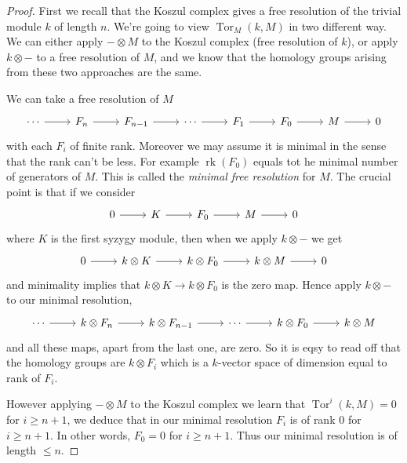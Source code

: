 \documentclass[a4paper]{article}
\DeclareMathOperator{\Tor}{Tor}
\begin{document}
\begin{proof}
  First we recall that the Koszul complex gives a free resolution of the trivial module \(k\) of length \(n\). We're going to view \(\Tor_M(k, M)\) in two different way. We can either apply \(- \otimes M\) to the Koszul complex (free resolution of \(k\)), or apply \(k \otimes -\) to a free resolution of \(M\), and we know that the homology groups arising from these two approaches are the same.

  We can take a free resolution of \(M\)
  \[
    \begin{tikzcd}
      \cdots \ar[r] & F_n \ar[r] & F_{n - 1} \ar[r] & \cdots \ar[r] & F_1 \ar[r] & F_0 \ar[r] & M \ar[r] & 0
    \end{tikzcd}
  \]
  with each \(F_i\) of finite rank. Moreover we may assume it is minimal in the sense that the rank can't be less. For example \(\operatorname{rk}(F_0)\) equals tot he minimal number of generators of \(M\). This is called the \emph{minimal free resolution} for \(M\). The crucial point is that if we consider
  \[
    \begin{tikzcd}
      0 \ar[r] & K \ar[r] & F_0 \ar[r] & M \ar[r] & 0
    \end{tikzcd}
  \]
  where \(K\) is the first syzygy module, then when we apply \(k \otimes -\) we get
  \[
    \begin{tikzcd}
      0 \ar[r] & k \otimes K \ar[r] & k \otimes F_0 \ar[r] & k \otimes M \ar[r] & 0
    \end{tikzcd}
  \]
  and minimality implies that \(k \otimes K \to k \otimes F_0\) is the zero map. Hence apply \(k \otimes -\) to our minimal resolution,
  \[
    \begin{tikzcd}
      \cdots \ar[r] & k \otimes F_n \ar[r] & k \otimes F_{n - 1} \ar[r] & \cdots \ar[r] & k \otimes F_0 \ar[r] & k \otimes M
    \end{tikzcd}
  \]
  and all these maps, apart from the last one, are zero. So it is eqsy to read off that the homology groups are \(k \otimes F_i\) which is a \(k\)-vector space of dimension equal to rank of \(F_i\).

  However applying \(- \otimes M\) to the Koszul complex we learn that \(\Tor^i(k, M) = 0\) for \(i \geq n + 1\), we deduce that in our minimal resolution \(F_i\) is of rank \(0\) for \(i \geq n + 1\). In other words, \(F_0 = 0\) for \(i \geq n + 1\). Thus our minimal resolution is of length \(\leq n\).
\end{proof}

\fi


\printindex
\end{document}
